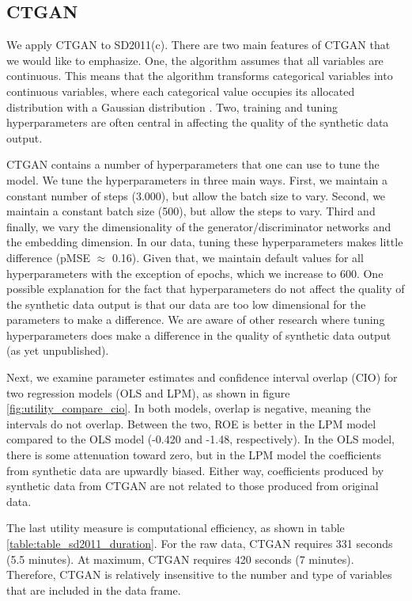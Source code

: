 \documentclass[runningheads]{llncs}
\begin{document}
\subsection{CTGAN} 

We apply CTGAN to SD2011(c).  There are two main features of CTGAN that we would like to emphasize.  One, the algorithm assumes that all variables are continuous.  This means that the algorithm transforms categorical variables into continuous variables, where each categorical value occupies its allocated distribution with a Gaussian distribution \cite{patki2016synthetic}.  Two, training and tuning hyperparameters are often central in affecting the quality of the synthetic data output.  

CTGAN contains a number of hyperparameters that one can use to tune the model.  We tune the hyperparameters in three main ways.  First, we maintain a constant number of steps (3.000), but allow the batch size to vary.  Second, we maintain a constant batch size (500), but allow the steps to vary.  Third and finally, we vary the dimensionality of the generator/discriminator networks and the embedding dimension.  In our data, tuning these hyperparameters makes little difference (pMSE $\approx$ 0.16).  Given that, we maintain default values for all hyperparameters with the exception of epochs, which we increase to 600.  One possible explanation for the fact that hyperparameters do not affect the quality of the synthetic data output is that our data are too low dimensional for the parameters to make a difference.  We are aware of other research where tuning hyperparameters does make a difference in the quality of synthetic data output (as yet unpublished).  

Next, we examine parameter estimates and confidence interval overlap (CIO) for two regression models (OLS and LPM), as shown in figure \ref{fig:utility_compare_cio}.  In both models, overlap is negative, meaning the intervals do not overlap.  Between the two, ROE is better in the LPM model compared to the OLS model (-0.420 and -1.48, respectively).  In the OLS model, there is some attenuation toward zero, but in the LPM model the coefficients from synthetic data are upwardly biased.  Either way, coefficients produced by synthetic data from CTGAN are not related to those produced from original data.

The last utility measure is computational efficiency, as shown in table \ref{table:table_sd2011_duration}.  For the raw data, CTGAN requires 331 seconds (5.5 minutes).  At maximum, CTGAN requires 420 seconds (7 minutes).  Therefore, CTGAN is relatively insensitive to the number and type of variables that are included in the data frame.  
\end{document}
